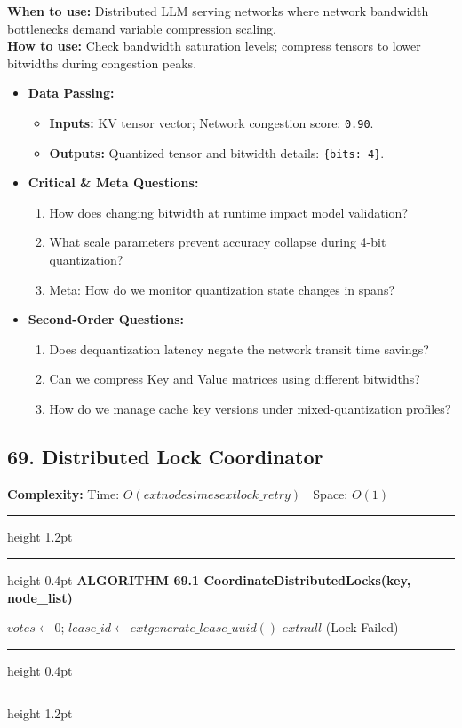 \documentclass[11pt,a4paper]{article}
\newenvironment{textbookalgo}[2]{%
  \par\addvspace{1.2em}\noindent
  \hrule height 1.2pt
  \vspace{1.5pt}
  \hrule height 0.4pt
  \vspace{5pt}
  {\noindent\large\bfseries\sffamily ALGORITHM #1 \quad #2}
  \par\vspace{5pt}
  \RestyleAlgo{plain}
}{%
  \par\vspace{4pt}
  \hrule height 0.4pt
  \vspace{1.5pt}
  \hrule height 1.2pt
  \par\addvspace{1.2em}
}
\theoremstyle{definition}
\begin{document}
\noindent
\textbf{When to use:} Distributed LLM serving networks where network bandwidth bottlenecks demand variable compression scaling.\\
\textbf{How to use:} Check bandwidth saturation levels; compress tensors to lower bitwidths during congestion peaks.
\begin{itemize}[leftmargin=*]
  \item[] \textbf{Data Passing:}
    \begin{itemize}
      \item \textbf{Inputs:} KV tensor vector; Network congestion score: \texttt{0.90}.
      \item \textbf{Outputs:} Quantized tensor and bitwidth details: \texttt{\{bits: 4\}}.
    \end{itemize}
  \item[] \textbf{Critical \& Meta Questions:}
  \begin{enumerate}
    \item How does changing bitwidth at runtime impact model validation?
    \item What scale parameters prevent accuracy collapse during 4-bit quantization?
    \item Meta: How do we monitor quantization state changes in spans?
  \end{enumerate}
  \item[] \textbf{Second-Order Questions:}
  \begin{enumerate}
    \item Does dequantization latency negate the network transit time savings?
    \item Can we compress Key and Value matrices using different bitwidths?
    \item How do we manage cache key versions under mixed-quantization profiles?
  \end{enumerate}
\end{itemize}
\medskip

\clearpage
\subsection{69. Distributed Lock Coordinator}


\noindent
\textbf{Complexity:} Time: $O(	ext{nodes} 	imes 	ext{lock\_retry})$ | Space: $O(1)$
\smallskip

\begin{textbookalgo}{69.1}{CoordinateDistributedLocks(key, node\_list)}
\begin{algorithm}[H]
$votes \leftarrow 0$; $lease\_id \leftarrow 	ext{generate\_lease\_uuid}()$\;
\Return $	ext{null}$ (Lock Failed)\;
\end{algorithm}
\end{textbookalgo}
\end{document}
